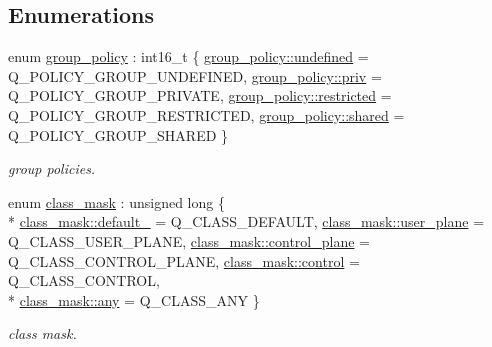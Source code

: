 \subsection*{Enumerations}
\begin{DoxyCompactItemize}
\item 
enum \hyperlink{namespacepfq_ac41249c8510558905b01fa4d866a38d7}{group\+\_\+policy} \+: int16\+\_\+t \{ \hyperlink{namespacepfq_ac41249c8510558905b01fa4d866a38d7a5e543256c480ac577d30f76f9120eb74}{group\+\_\+policy\+::undefined} = Q\+\_\+\+P\+O\+L\+I\+C\+Y\+\_\+\+G\+R\+O\+U\+P\+\_\+\+U\+N\+D\+E\+F\+I\+N\+E\+D, 
\hyperlink{namespacepfq_ac41249c8510558905b01fa4d866a38d7a908b453051b556e053731714a5193921}{group\+\_\+policy\+::priv} = Q\+\_\+\+P\+O\+L\+I\+C\+Y\+\_\+\+G\+R\+O\+U\+P\+\_\+\+P\+R\+I\+V\+A\+T\+E, 
\hyperlink{namespacepfq_ac41249c8510558905b01fa4d866a38d7ac89b33f8b3f6f452ef6f07d397b5dcdf}{group\+\_\+policy\+::restricted} = Q\+\_\+\+P\+O\+L\+I\+C\+Y\+\_\+\+G\+R\+O\+U\+P\+\_\+\+R\+E\+S\+T\+R\+I\+C\+T\+E\+D, 
\hyperlink{namespacepfq_ac41249c8510558905b01fa4d866a38d7a9e81e7b963c71363e2fb3eefcfecfc0e}{group\+\_\+policy\+::shared} = Q\+\_\+\+P\+O\+L\+I\+C\+Y\+\_\+\+G\+R\+O\+U\+P\+\_\+\+S\+H\+A\+R\+E\+D
 \}
\begin{DoxyCompactList}\small\item\em group policies. \end{DoxyCompactList}\item 
enum \hyperlink{namespacepfq_a96af1f5ed530eff563eb917516758fbb}{class\+\_\+mask} \+: unsigned long \{ \\*
\hyperlink{namespacepfq_a96af1f5ed530eff563eb917516758fbba172b03053216c6158fe380805998ad6c}{class\+\_\+mask\+::default\+\_\+} = Q\+\_\+\+C\+L\+A\+S\+S\+\_\+\+D\+E\+F\+A\+U\+L\+T, 
\hyperlink{namespacepfq_a96af1f5ed530eff563eb917516758fbba539d70f37267eda88597177e215a6d2a}{class\+\_\+mask\+::user\+\_\+plane} = Q\+\_\+\+C\+L\+A\+S\+S\+\_\+\+U\+S\+E\+R\+\_\+\+P\+L\+A\+N\+E, 
\hyperlink{namespacepfq_a96af1f5ed530eff563eb917516758fbba1ed75f78f4a1cf2529490db57b294978}{class\+\_\+mask\+::control\+\_\+plane} = Q\+\_\+\+C\+L\+A\+S\+S\+\_\+\+C\+O\+N\+T\+R\+O\+L\+\_\+\+P\+L\+A\+N\+E, 
\hyperlink{namespacepfq_a96af1f5ed530eff563eb917516758fbbafc5364bf9dbfa34954526becad136d4b}{class\+\_\+mask\+::control} = Q\+\_\+\+C\+L\+A\+S\+S\+\_\+\+C\+O\+N\+T\+R\+O\+L, 
\\*
\hyperlink{namespacepfq_a96af1f5ed530eff563eb917516758fbba100b8cad7cf2a56f6df78f171f97a1ec}{class\+\_\+mask\+::any} = Q\+\_\+\+C\+L\+A\+S\+S\+\_\+\+A\+N\+Y
 \}
\begin{DoxyCompactList}\small\item\em class mask. \end{DoxyCompactList}\end{DoxyCompactItemize}
